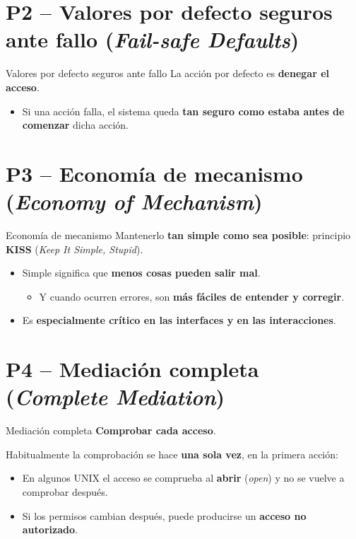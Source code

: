 \documentclass[11pt,a4paper]{report}
\begin{document}
\section{P2 -- Valores por defecto seguros ante fallo (\emph{Fail-safe Defaults})}

\begin{definicion}{Valores por defecto seguros ante fallo}
La acción por defecto es \textbf{denegar el acceso}.
\end{definicion}
\begin{itemize}
  \item Si una acción falla, el sistema queda \textbf{tan seguro como estaba antes de comenzar} dicha acción.
\end{itemize}

\section{P3 -- Economía de mecanismo (\emph{Economy of Mechanism})}

\begin{definicion}{Economía de mecanismo}
Mantenerlo \textbf{tan simple como sea posible}: principio \textbf{KISS} (\emph{Keep It Simple, Stupid}).
\end{definicion}
\begin{itemize}
  \item Simple significa que \textbf{menos cosas pueden salir mal}.
    \begin{itemize}
      \item Y cuando ocurren errores, son \textbf{más fáciles de entender y corregir}.
    \end{itemize}
  \item Es \textbf{especialmente crítico en las interfaces y en las interacciones}.
\end{itemize}

\section{P4 -- Mediación completa (\emph{Complete Mediation})}

\begin{definicion}{Mediación completa}
\textbf{Comprobar cada acceso}.
\end{definicion}
Habitualmente la comprobación se hace \textbf{una sola vez}, en la primera acción:
\begin{itemize}
  \item En algunos UNIX el acceso se comprueba al \textbf{abrir} (\emph{open}) y no se vuelve a comprobar después.
  \item Si los permisos cambian después, puede producirse un \textbf{acceso no autorizado}.
\end{itemize}
\end{document}
